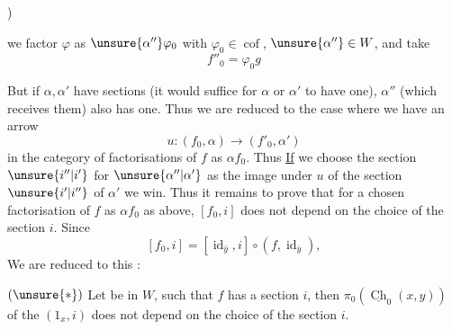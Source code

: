 )


we factor $\varphi$ as $\unsure{\alpha''}\varphi_0$ with $\varphi_0\in\operatorname{cof}$, $\unsure{\alpha''}\in W$, and take
\[f''_0=\varphi_0 g\]

But if $\alpha,\alpha'$ have sections (it would suffice for $\alpha$ or $\alpha'$ to have one),    $\alpha''$ (which receives them) also has one. Thus we are reduced to the case where we have an arrow
\[u:(f_0,\alpha)\longrightarrow(f'_0,\alpha')\]
in the category of factorisations of $f$ as $\alpha f_0$. Thus \uline{If} we choose the section $\unsure{i''|i'}$ for $\unsure{\alpha''|\alpha'}$ as the image under $u$ of the section $\unsure{i'|i''}$ of $\alpha'$ \unsure{,} we win. Thus it remains to prove that
for a chosen factorisation of $f$ as $\alpha f_0$ as above, $[f_0,i]$ does not depend on the choice of the section $i$. Since
\[[f_0,i]=[\operatorname{id}_{\bar y},i]\circ(f,\operatorname{id}_{\bar y}),\]
We are reduced to this :

$(\unsure{*})$ Let
be in $W$, such that $f$ has a  section $i$, then    $\pi_0(\underline{\operatorname{Ch}}_0(x,y))$  of the $(1_x,i)$
does not depend on the choice of the section $i$.

